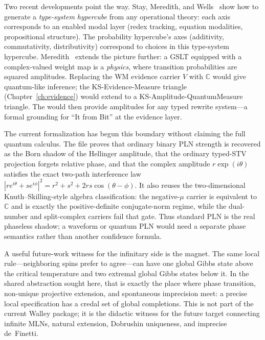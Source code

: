 \documentclass[11pt,openany]{report}
\begin{document}
Two recent developments point the way.
Stay, Meredith, and Wells~\cite{StayMeredithWells2026}
show how to generate a \emph{type-system hypercube} from any
operational theory: each axis corresponds to an enabled modal
layer (redex tracking, equation modalities, propositional
structure).  The probability hypercube's axes (additivity,
commutativity, distributivity) correspond to choices in this
type-system hypercube.
Meredith~\cite{meredith2026ccc} extends the picture further:
a GSLT equipped with a complex-valued weight map is a
\emph{physics}, where transition probabilities are squared
amplitudes.  Replacing the WM evidence carrier $V$ with
$\mathbb{C}$ would give quantum-like inference; the
KS-Evidence-Measure triangle (Chapter~\ref{ch:evidence})
would extend to a KS-Amplitude-QuantumMeasure triangle.
The  would then provide
amplitudes for any typed rewrite system---a formal grounding
for ``It from Bit'' at the evidence layer.

The current formalization has begun this boundary without claiming the
full quantum calculus.  The file
 proves that ordinary
binary PLN strength is recovered as the Born shadow of the Hellinger
amplitude, that the ordinary typed-STV projection forgets relative
phase, and that the complex amplitude
$r\exp(i\theta)$ satisfies the exact two-path interference law
$|r e^{i\theta}+s e^{i\phi}|^2
= r^2+s^2+2rs\cos(\theta-\phi)$.  It also reuses the
two-dimensional Knuth--Skilling-style algebra classification:
the negative-$\mu$ carrier is equivalent to $\mathbb{C}$ and is exactly
the positive-definite conjugate-norm regime, while the dual-number and
split-complex carriers fail that gate.  Thus standard PLN is the real
phaseless shadow; a waveform or quantum PLN would need a separate phase
semantics rather than another confidence formula.

A useful future-work witness for the infinitary side is the magnet.
The same local rule---neighboring spins prefer to agree---can have one
global Gibbs state above the critical temperature and two extremal
global Gibbs states below it.  In the shared abstraction sought here,
that is exactly the place where phase transition, non-unique projective
extension, and spontaneous imprecision meet: a precise local
specification has a credal set of global completions.  This is not part
of the current Walley package; it is the didactic witness for the
future  target connecting infinite MLNs,
natural extension, Dobrushin uniqueness, and imprecise de~Finetti.
\end{document}
